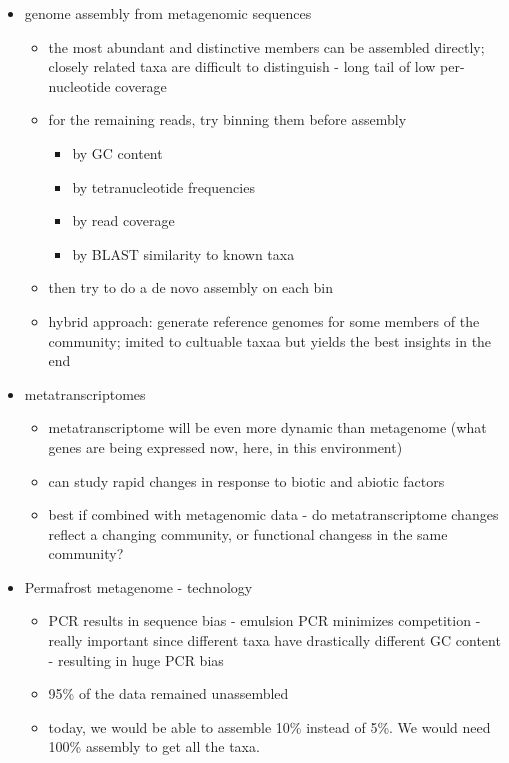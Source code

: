 \documentclass{article}
\begin{document}
\begin{itemize}
\begin{itemize}
        \end{itemize}
        \item genome assembly from metagenomic sequences
        \begin{itemize}
            \item the most abundant and distinctive members can be assembled directly; closely related taxa are difficult to distinguish - long tail of low per-nucleotide coverage
            \item for the remaining reads, try binning them before assembly
            \begin{itemize}
                \item by GC content
                \item by tetranucleotide frequencies
                \item by read coverage
                \item by BLAST similarity to known taxa
            \end{itemize}
            \item then try to do a de novo assembly on each bin
            \item hybrid approach: generate reference genomes for some members of the community; imited to cultuable taxaa but yields the best insights in the end
        \end{itemize}
        \item metatranscriptomes
        \begin{itemize}
            \item metatranscriptome will be even more dynamic than metagenome (what genes are being expressed now, here, in this environment)
            \item can study rapid changes in response to biotic and abiotic factors
            \item best if combined with metagenomic data - do metatranscriptome changes reflect a changing community, or functional changess in the same community?
        \end{itemize}
        \item Permafrost metagenome - technology
        \begin{itemize}
            \item PCR results in sequence bias - emulsion PCR minimizes competition - really important since different taxa have drastically different GC content - resulting in huge PCR bias
            \item 95\% of the data remained unassembled
            \item today, we would be able to assemble 10\% instead of 5\%.  We would need 100\% assembly to get all the taxa.

\end{itemize}
\end{itemize}
\end{document}
